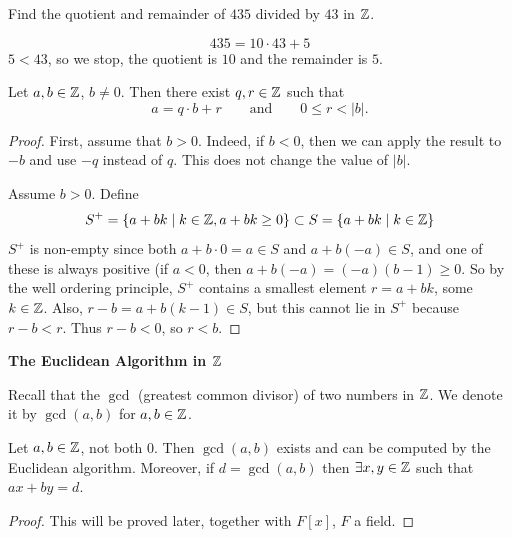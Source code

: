 \documentclass[10pt, a4paper]{article}
\begin{document}
\begin{example}
    Find the quotient and remainder of $435$ divided by $43$ in $\mathbb{Z}$.

    \begin{solution}
        \[
        435 = 10 \cdot 43 + 5
        \]
        $5 < 43$,
        so we stop,
        the quotient is $10$ and the remainder is $5$.
    \end{solution}
\end{example}

\begin{proposition}
    Let $a, b \in \mathbb{Z}$,
    $b \neq 0$.
    Then there exist $q, r \in \mathbb{Z}$ such that
    \[
    a = q \cdot b + r\qquad\text{and}\qquad 0 \leq r < |b|.
    \]

    \begin{proof}
        First,
        assume that $b > 0$.
        Indeed,
        if $b < 0$,
        then we can apply the result to $-b$ and use $-q$ instead of $q$.
        This does not change the value of $|b|$.

        Assume $b > 0$.
        Define
        \[
        S ^ {+} = \{a + bk \mid k \in \mathbb{Z}, a + bk \geq 0\} \subset S = \{a + bk \mid k \in \mathbb{Z}\}
        \]
        $S ^ {+}$ is non-empty since both $a + b\cdot 0 = a \in S$ and $a + b(-a) \in S$,
        and one of these is always positive
        (if $a < 0$,
        then $a + b(-a) = (-a)(b - 1) \geq 0$.
        So by the well ordering principle,
        $S ^ {+}$ contains a smallest element $r = a + bk$,
        some $k \in \mathbb{Z}$.
        Also,
        $r - b = a + b(k - 1) \in S$,
        but this cannot lie in $S ^ {+}$ because $r - b < r$.
        Thus $r - b < 0$,
        so $r < b$.
    \end{proof}
\end{proposition}

\textbf{The Euclidean Algorithm in $\mathbb{Z}$}

Recall that the $\gcd$
(greatest common divisor)
of two numbers in $\mathbb{Z}$.
We denote it by $\gcd(a, b)$ for $a, b \in \mathbb{Z}$.

\begin{theorem}
    Let $a, b \in \mathbb{Z}$,
    not both $0$.
    Then $\gcd(a, b)$ exists and can be computed by the Euclidean algorithm.
    Moreover,
    if $d = \gcd(a, b)$ then $\exists x, y \in \mathbb{Z}$ such that $ax + by = d$.

    \begin{proof}
        This will be proved later,
        together with $F[x]$,
        $F$ a field.
    \end{proof}
\end{theorem}
\end{document}
